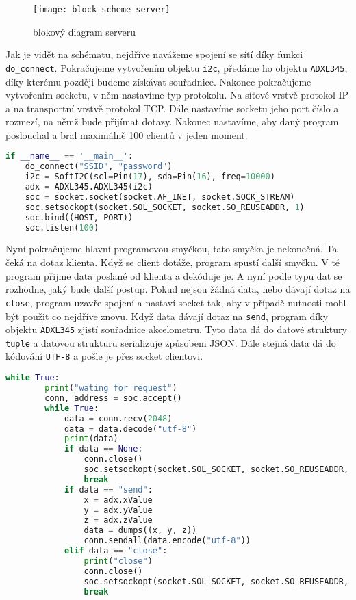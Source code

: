 \documentclass[12pt]{report}			%
\begin{document}
\begin{figure}[h]
\caption{blokový diagram serveru}
\centering
 \texttt{[image: block\_scheme\_server]}
\end{figure}

Jak je vidět na schématu, nejdříve navážeme spojení se sítí díky funkci \texttt{do\_connect}. Pokračujeme vytvořením objektu \texttt{i2c}, předáme ho objektu \texttt{ADXL345}, díky kterému později budeme získávat souřadnice. Nakonec pokračujeme vytvořením socketu, v něm nastavíme typ protokolu. Na síťové vrstvě protokol IP a na transportní vrstvě protokol TCP. Dále nastavíme socketu jeho port číslo a rozmezí, na němž bude přijímat dotazy. Nakonec nastavíme, aby daný program poslouchal a bral maximálně 100 clientů v jeden moment. 

\begin{lstlisting}[title={Program server.py}, caption={server.py}, language=Python]
if __name__ == '__main__':
    do_connect("SSID", "password")
    i2c = SoftI2C(scl=Pin(17), sda=Pin(16), freq=10000)
    adx = ADXL345.ADXL345(i2c)
    soc = socket.socket(socket.AF_INET, socket.SOCK_STREAM)
    soc.setsockopt(socket.SOL_SOCKET, socket.SO_REUSEADDR, 1)
    soc.bind((HOST, PORT))
    soc.listen(100)
\end{lstlisting}

Nyní pokračujeme hlavní programovou smyčkou, tato smyčka je nekonečná. Ta čeká na dotaz klienta. Když se client dotáže, program spustí další smyčku. V té program přijme data poslané od klienta a dekóduje je. A nyní podle typu dat se rozhodne, jaký bude další postup. Pokud nejsou žádná data, nebo dávají dotaz na \texttt{close}, program uzavře spojení a nastaví socket tak, aby v případě nutnosti mohl být použit co nejdříve znovu. Když data dávají dotaz na \texttt{send}, program díky objektu \texttt{ADXL345} zjistí souřadnice akcelometru. Tyto data dá do datové struktury \texttt{tuple} a datovou strukturu serializuje způsobem JSON. Dále stejná data dá do kódování \texttt{UTF-8} a pošle je přes socket clientovi. 

\begin{lstlisting}[title={Program server.py}, caption={server.py}, language=Python]
  while True:
        print("wating for request")
        conn, address = soc.accept()
        while True:
            data = conn.recv(2048)
            data = data.decode("utf-8")
            print(data)
            if data == None:
                conn.close()
                soc.setsockopt(socket.SOL_SOCKET, socket.SO_REUSEADDR, 1)
                break
            if data == "send":
                x = adx.xValue
                y = adx.yValue
                z = adx.zValue
                data = dumps((x, y, z))
                conn.sendall(data.encode("utf-8"))
            elif data == "close":
                print("close")
                conn.close()
                soc.setsockopt(socket.SOL_SOCKET, socket.SO_REUSEADDR, 1)
                break
\end{lstlisting}
\end{document}
